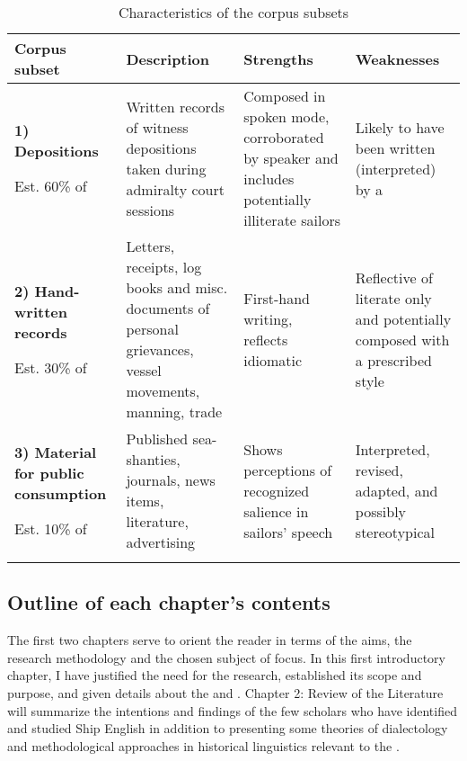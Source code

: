 \begin{table}
\caption{\label{tab:key:1.2}Characteristics of the corpus subsets}
\begin{tabularx}{\textwidth}{QQQQ}
\lsptoprule

\textbf{Corpus subset} & \textbf{Description} & \textbf{Strengths} & \textbf{Weaknesses}\\
\midrule 
\textbf{1) Depositions}

Est. 60\% of  & Written records of witness depositions taken during admiralty court sessions & Composed in spoken mode, corroborated by speaker and includes potentially illiterate sailors & Likely to have been written (interpreted) by a \\

\tablevspace
\textbf{2) Hand-written records}

Est. 30\% of  & Letters, receipts, log books and misc. documents of personal grievances, vessel movements, manning, trade & First-hand writing, reflects idiomatic  & Reflective of literate  only and potentially composed with a prescribed style\\

\tablevspace
\textbf{3) Material for public consumption}

Est. 10\% of  & Published sea-shanties, journals, news items, literature, advertising & Shows perceptions of recognized salience in sailors’ speech & Interpreted, revised, adapted, and possibly stereotypical \\
\lspbottomrule
\end{tabularx}
\end{table}

\subsection{{Outline of each chapter’s contents}}\label{sec:1.3.3}



The first two chapters serve to orient the reader in terms of the aims, the research methodology and the chosen subject of focus. In this first introductory chapter, I have justified the need for the research, established its scope and purpose, and given details about the  and . Chapter 2: Review of the Literature will summarize the intentions and findings of the few scholars who have identified and studied Ship English in addition to presenting some theories of dialectology and methodological approaches in historical linguistics relevant to the . 



